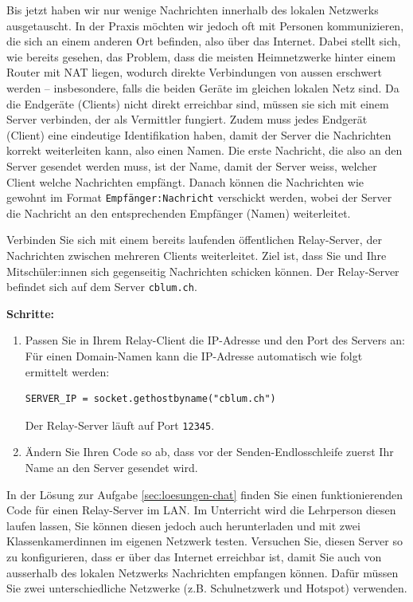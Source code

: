 Bis jetzt haben wir nur wenige Nachrichten innerhalb des lokalen Netzwerks ausgetauscht. In der Praxis möchten wir jedoch oft mit Personen kommunizieren, die sich an einem anderen Ort befinden, also über das Internet. Dabei stellt sich, wie bereits gesehen, das Problem, dass die meisten Heimnetzwerke hinter einem Router mit \gls{NAT} liegen, wodurch direkte Verbindungen von aussen erschwert werden -- insbesondere, falls die beiden Geräte im gleichen lokalen Netz sind. Da die Endgeräte (Clients) nicht direkt erreichbar sind, müssen sie sich mit einem Server verbinden, der als Vermittler fungiert. Zudem muss jedes Endgerät (Client) eine eindeutige Identifikation haben, damit der Server die Nachrichten korrekt weiterleiten kann, also einen Namen. Die erste Nachricht, die also an den Server gesendet werden muss, ist der Name, damit der Server weiss, welcher Client welche Nachrichten empfängt. Danach können die Nachrichten wie gewohnt im Format \texttt{Empfänger:Nachricht} verschickt werden, wobei der Server die Nachricht an den entsprechenden Empfänger (Namen) weiterleitet.

\begin{myexercise}\label{ex:chat-relay-client-wan}
    Verbinden Sie sich mit einem bereits laufenden öffentlichen Relay-Server, der Nachrichten zwischen mehreren Clients weiterleitet. Ziel ist, dass Sie und Ihre Mitschüler:innen sich gegenseitig Nachrichten schicken können. Der Relay-Server befindet sich auf dem Server \texttt{cblum.ch}.

    \textbf{Schritte:}
    \begin{enumerate}
        \item Passen Sie in Ihrem Relay-Client die IP-Adresse und den Port des Servers an: Für einen Domain-Namen kann die IP-Adresse automatisch wie folgt ermittelt werden:
              \begin{lstlisting}
SERVER_IP = socket.gethostbyname("cblum.ch")
\end{lstlisting}
              Der Relay-Server läuft auf Port \texttt{12345}.
        \item Ändern Sie Ihren Code so ab, dass vor der Senden-Endlosschleife zuerst Ihr Name an den Server gesendet wird.
    \end{enumerate}
\end{myexercise}

\begin{mychallenge}
    In der Lösung zur Aufgabe \cref{sec:loesungen-chat} finden Sie einen funktionierenden Code für einen Relay-Server im \gls{LAN}. Im Unterricht wird die Lehrperson diesen laufen lassen, Sie können diesen jedoch auch herunterladen und mit zwei Klassenkamerdinnen im eigenen Netzwerk testen. Versuchen Sie, diesen Server so zu konfigurieren, dass er über das Internet erreichbar ist, damit Sie auch von ausserhalb des lokalen Netzwerks Nachrichten empfangen können. Dafür müssen Sie zwei unterschiedliche Netzwerke (z.B. Schulnetzwerk und Hotspot) verwenden.
\end{mychallenge}

